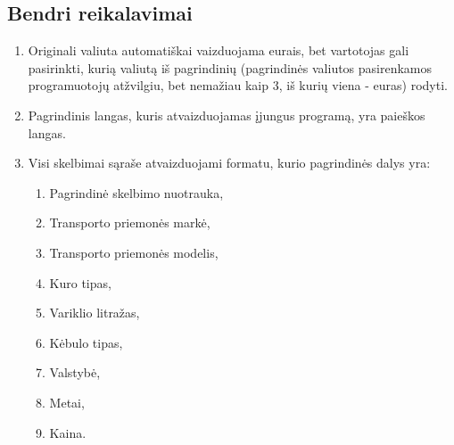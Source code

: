 \documentclass[12pt]{article}
\renewcommand{\thesubsection}{FR\arabic{subsection}}
\renewcommand*{\theenumi}{\thesubsection.\arabic{enumi}}
\begin{document}
	\subsection{Bendri reikalavimai}	
	\begin{enumerate}[labelindent=10pt,leftmargin=2.2cm]
		\item Originali valiuta automatiškai vaizduojama eurais, bet vartotojas gali pasirinkti, kurią valiutą iš pagrindinių (pagrindinės valiutos pasirenkamos programuotojų atžvilgiu, bet nemažiau kaip 3, iš kurių viena - euras) rodyti.
		\item\label{MainWindowDisplayReq} Pagrindinis langas, kuris atvaizduojamas įjungus programą, yra paieškos langas.
		\item\label{AdParts} Visi skelbimai sąraše atvaizduojami formatu, kurio pagrindinės dalys yra:
		
		\begin{enumerate}[label=\theenumi.\arabic{enumii}]
			\item Pagrindinė skelbimo nuotrauka,
			\item Transporto priemonės markė,
			\item Transporto priemonės modelis,
			\item Kuro tipas,
			\item Variklio litražas,
			\item Kėbulo tipas,
			\item Valstybė,
			\item Metai,
			\item Kaina.
		\end{enumerate}
		

\end{enumerate}
\end{document}
